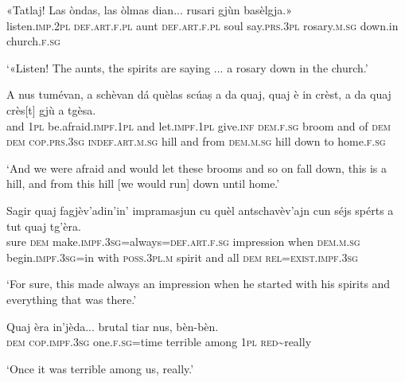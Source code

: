 \begin{linenumbers}
\gll «Tatlaj! Las òndas, las òlmas dian... rusari gjùn basèlgja.»  \\
     listen.\textsc{imp.2pl} \textsc{def.art.f.pl} aunt \textsc{def.art.f.pl} soul say.\textsc{prs.3pl} rosary.\textsc{m.sg} down.in church.\textsc{f.sg} \\
\end{linenumbers}
\medskip
\glt `«Listen! The aunts, the spirits are saying ... a rosary down in the church.'
\medskip

\begin{linenumbers}
\gll    A nus tumévan, a schèvan dá quèlas scúaṣ a da quaj, quaj è in crèst, a da quaj crès[t] gjù a tgèsa.\\
  and \textsc{1pl} be.afraid.\textsc{impf.1pl} and let.\textsc{impf.1pl} give.\textsc{inf} \textsc{dem.f.sg} broom and of \textsc{dem} \textsc{dem} \textsc{cop.prs.3sg} \textsc{indef.art.m.sg} hill and from \textsc{dem.m.sg} hill down to home.\textsc{f.sg} \\
\end{linenumbers}
\medskip
\glt `And we were afraid and would let these brooms and so on fall down, this is a hill, and from this hill [we would run] down until home.'
\medskip

\begin{linenumbers}
\gll  Sagir quaj fagjèv’adin’in’ impramasjun cu quèl antschavèv’ajn cun séjs spérts a tut quaj tg’èra.  \\
     sure  \textsc{dem} make.\textsc{impf.3sg}=always=\textsc{def.art.f.sg} impression when \textsc{dem.m.sg} begin.\textsc{impf.3sg=}in with \textsc{poss.3pl.m} spirit  and all \textsc{dem} \textsc{rel=exist.impf.3sg}  \\
\end{linenumbers}
\medskip
\glt `For sure, this made always an impression when he started with his spirits and everything that was there.'
\medskip

\begin{linenumbers}
\gll Quaj èra in’jèda... brutal tiar nus, bèn-bèn.   \\
     \textsc{dem} \textsc{cop.impf.3sg} one.\textsc{f.sg}=time terrible among \textsc{1pl} \textsc{red}\textasciitilde{really} \\
\end{linenumbers}
\medskip
\glt `Once it was terrible among us, really.'
\medskip

